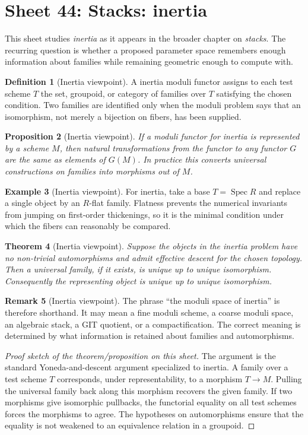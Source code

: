 \documentclass[11pt]{amsart}
\newtheorem{theorem}{Theorem}[section]
\newtheorem{proposition}[theorem]{Proposition}
\theoremstyle{definition}
\newtheorem{definition}[theorem]{Definition}
\newtheorem{example}[theorem]{Example}
\newtheorem{remark}[theorem]{Remark}
\newcommand{\Spec}{\operatorname{Spec}}
\begin{document}
\section{Sheet 44: Stacks: inertia}
This sheet studies \emph{inertia} as it appears in the broader chapter on \emph{stacks}.  The recurring question is whether a proposed parameter space remembers enough information about families while remaining geometric enough to compute with.
\begin{definition}[Inertia viewpoint]
A inertia moduli functor assigns to each test scheme $T$ the set, groupoid, or category of families over $T$ satisfying the chosen condition.  Two families are identified only when the moduli problem says that an isomorphism, not merely a bijection on fibers, has been supplied.
\end{definition}
\begin{proposition}[Inertia viewpoint]
If a moduli functor for inertia is represented by a scheme $M$, then natural transformations from the functor to any functor $G$ are the same as elements of $G(M)$.  In practice this converts universal constructions on families into morphisms out of $M$.
\end{proposition}
\begin{example}[Inertia viewpoint]
For inertia, take a base $T=\Spec R$ and replace a single object by an $R$-flat family.  Flatness prevents the numerical invariants from jumping on first-order thickenings, so it is the minimal condition under which the fibers can reasonably be compared.
\end{example}
\begin{theorem}[Inertia viewpoint]
Suppose the objects in the inertia problem have no non-trivial automorphisms and admit effective descent for the chosen topology.  Then a universal family, if it exists, is unique up to unique isomorphism.  Consequently the representing object is unique up to unique isomorphism.
\end{theorem}
\begin{remark}[Inertia viewpoint]
The phrase ``the moduli space of inertia'' is therefore shorthand.  It may mean a fine moduli scheme, a coarse moduli space, an algebraic stack, a GIT quotient, or a compactification.  The correct meaning is determined by what information is retained about families and automorphisms.
\end{remark}
\begin{proof}[Proof sketch of the theorem/proposition on this sheet]
The argument is the standard Yoneda-and-descent argument specialized to inertia.  A family over a test scheme $T$ corresponds, under representability, to a morphism $T\to M$.  Pulling the universal family back along this morphism recovers the given family.  If two morphisms give isomorphic pullbacks, the functorial equality on all test schemes forces the morphisms to agree.  The hypotheses on automorphisms ensure that the equality is not weakened to an equivalence relation in a groupoid.
\end{proof}
\end{document}
